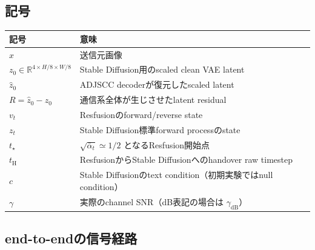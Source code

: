 \documentclass[11pt,a4paper]{ltjsarticle}
\newcommand{\R}{\mathbb{R}}
\begin{document}
\subsection{記号}

\begin{table}[htbp]
  \centering
  \begin{tabularx}{\linewidth}{>{\raggedright\arraybackslash}p{.22\linewidth}X}
    \toprule
    記号 & 意味 \\
    \midrule
    \(x\) & 送信元画像 \\
    \(z_0\in\R^{4\times H/8\times W/8}\) &
      Stable Diffusion用のscaled clean VAE latent \\
    \(\hat z_0\) & ADJSCC decoderが復元したscaled latent \\
    \(R=\hat z_0-z_0\) & 通信系全体が生じさせたlatent residual \\
    \(v_t\) & Resfusionのforward/reverse state \\
    \(z_t\) & Stable Diffusion標準forward processのstate \\
    \(t_\star\) & \(\sqrt{\bar\alpha_t}\simeq 1/2\) となるResfusion開始点 \\
    \(t_{\mathrm H}\) & ResfusionからStable Diffusionへのhandover raw timestep \\
    \(c\) & Stable Diffusionのtext condition（初期実験ではnull condition） \\
    \(\gamma\) & 実際のchannel SNR（dB表記の場合は \(\gamma_{\mathrm{dB}}\)） \\
    \bottomrule
  \end{tabularx}
\end{table}

\subsection{end-to-endの信号経路}

\begin{center}
\small
{}
\end{center}
\end{document}
